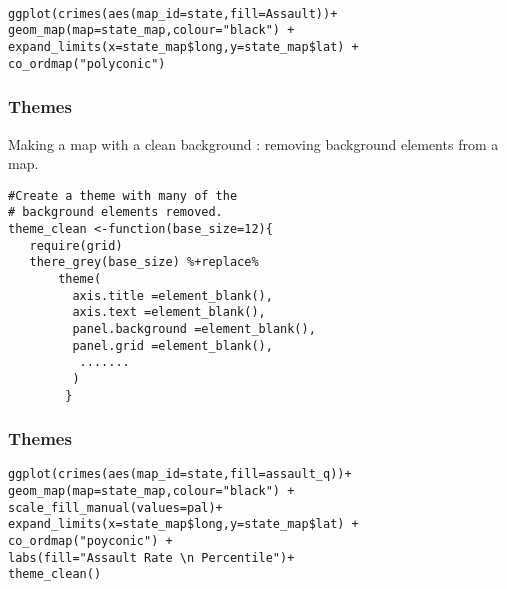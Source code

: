 \documentclass{beamer}
\begin{document}
\begin{frame}[fragile]
\begin{framed}
\begin{verbatim}

ggplot(crimes(aes(map_id=state,fill=Assault))+
geom_map(map=state_map,colour="black") + 
expand_limits(x=state_map$long,y=state_map$lat) +
co_ordmap("polyconic")
\end{verbatim}
\end{framed}
\end{frame}
\begin{frame}[fragile]
\frametitle{Themes}
Making a map with a clean background : removing background elements from a map.


\begin{framed}
\begin{verbatim}
#Create a theme with many of the 
# background elements removed.
theme_clean <-function(base_size=12){
   require(grid)
   there_grey(base_size) %+replace%
       theme(
         axis.title =element_blank(),
         axis.text =element_blank(),
         panel.background =element_blank(),
         panel.grid =element_blank(),
          .......
         )
        }
\end{verbatim}
\end{framed}
\end{frame}
\begin{frame}[fragile]
\frametitle{Themes}
\begin{framed}
\begin{verbatim}
ggplot(crimes(aes(map_id=state,fill=assault_q))+
geom_map(map=state_map,colour="black") + 
scale_fill_manual(values=pal)+
expand_limits(x=state_map$long,y=state_map$lat) +
co_ordmap("poyconic") + 
labs(fill="Assault Rate \n Percentile")+
theme_clean()

\end{verbatim}
\end{framed}
\end{frame}

 

\end{document}

